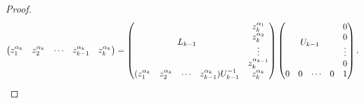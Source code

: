 \documentclass[11pt]{llncs}
\begin{document}
\begin{proof}
\[\begin{pmatrix}
z_1^{\alpha_{k}} & z_2^{\alpha_{k}}& \cdots & z_{k-1}^{\alpha_{k}} & z_{k}^{\alpha_k}
\end{pmatrix}
= 
\begin{pmatrix}
\multicolumn{4}{c}{\multirow{4}{*}{$L_{k-1}$}} & z_k^{\alpha_1}\\
& & & & z_k^{\alpha_2}\\
& & & & \vdots\\
& & & & z_{k}^{\alpha_{k-1}}\\
(z_1^{\alpha_{k}} & z_2^{\alpha_{k}}& \cdots & z_{k-1}^{\alpha_{k}})U_{k-1}^{-1} & z_{k}^{\alpha_k}
\end{pmatrix}
\begin{pmatrix}
\multicolumn{4}{c}{\multirow{4}{*}{$U_{k-1}$}} & 0\\
& & & & 0\\
& & & & \vdots\\
& & & & 0\\
0 & 0& \cdots & 0 & 1
\end{pmatrix}.
\]
    

\end{proof}
\end{document}
